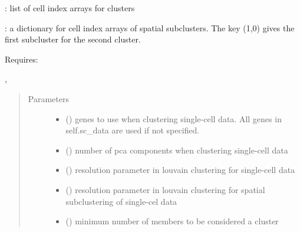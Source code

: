 \documentclass[letterpaper,10pt,english]{sphinxmanual}
\begin{document}
\begin{fulllineitems}
\begin{fulllineitems}
: list of cell index arrays for clusters

: a dictionary for cell index arrays of spatial subclusters. The key (1,0) gives the first subcluster for the second cluster.

Requires:

, 
\begin{quote}\begin{description}
\item[{Parameters}] \leavevmode\begin{itemize}
\item {} 
 () \textendash{} genes to use when clustering single-cell data. All genes in self.sc\_data are used if not specified.

\item {} 
 () \textendash{} number of pca components when clustering single-cell data

\item {} 
 (\sphinxstyleliteralemphasis{, }) \textendash{} resolution parameter in louvain clustering for single-cell data

\item {} 
 (\sphinxstyleliteralemphasis{, }) \textendash{} resolution parameter in louvain clustering for spatial subclustering of single-cel data

\item {} 
 (\sphinxstyleliteralemphasis{, }) \textendash{} minimum number of members to be considered a cluster

\end{itemize}

\end{description}\end{quote}

\end{fulllineitems}



\end{fulllineitems}
\end{document}
